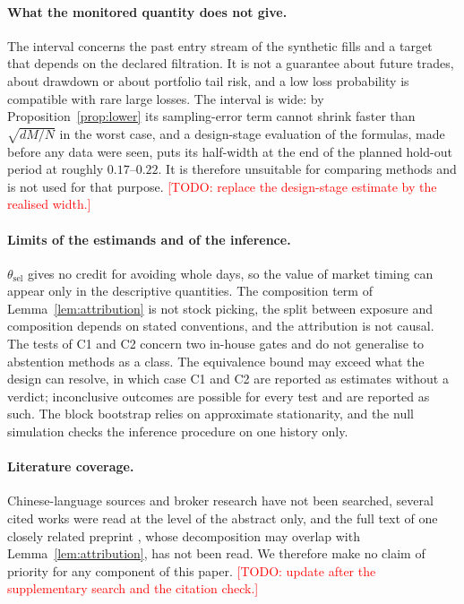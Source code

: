 \documentclass[11pt]{article}
\theoremstyle{remark}
\newcommand{\todo}[1]{\textcolor{red}{[TODO: #1]}}
\newcommand{\thetasel}{\theta_{\mathrm{sel}}}
\begin{document}
\paragraph{What the monitored quantity does not give.}
The interval concerns the past entry stream of the synthetic fills and a target that depends on
the declared filtration. It is not a guarantee about future trades, about drawdown or about
portfolio tail risk, and a low loss probability is compatible with rare large losses. The
interval is wide: by Proposition~\ref{prop:lower} its sampling-error term cannot shrink faster
than $\sqrt{dM/N}$ in the worst case, and a design-stage evaluation of the formulas, made before
any data were seen, puts its half-width at the end of the planned hold-out period at roughly
$0.17$--$0.22$. It is therefore unsuitable for comparing methods and is not used for that
purpose.
\todo{replace the design-stage estimate by the realised width.}

\paragraph{Limits of the estimands and of the inference.}
$\thetasel$ gives no credit for avoiding whole days, so the value of market timing can appear
only in the descriptive quantities. The composition term of Lemma~\ref{lem:attribution} is not
stock picking, the split between exposure and composition depends on stated conventions, and the
attribution is not causal. The tests of C1 and C2 concern two in-house gates and do not
generalise to abstention methods as a class. The equivalence bound may exceed what the design
can resolve, in which case C1 and C2 are reported as estimates without a verdict; inconclusive
outcomes are possible for every test and are reported as such. The block bootstrap relies on
approximate stationarity, and the null simulation checks the inference procedure on one history
only.

\paragraph{Literature coverage.}
Chinese-language sources and broker research have not been searched, several cited works were
read at the level of the abstract only, and the full text of one closely related preprint
\citep{guo2026whennot}, whose decomposition may overlap with Lemma~\ref{lem:attribution}, has
not been read. We therefore make no claim of priority for any component of this paper.
\todo{update after the supplementary search and the citation check.}
\end{document}
